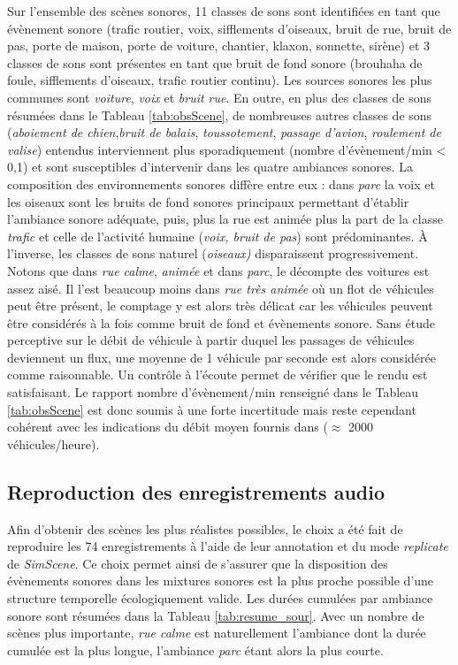 Sur l'ensemble des scènes sonores, 11 classes de sons sont identifiées en tant que évènement sonore  (trafic routier, voix, sifflements d'oiseaux, bruit de rue, bruit de pas, porte de maison, porte de voiture, chantier, klaxon, sonnette, sirène) et 3 classes de sons sont présentes en tant que bruit de fond sonore (brouhaha de foule, sifflements d'oiseaux, trafic routier continu).
Les sources sonores les plus communes sont \textit{voiture}, \textit{voix} et \textit{bruit rue}. En outre, en plus des classes de sons résumées dans le Tableau \ref{tab:obsScene}, de nombreuses autres classes de sons (\textit{aboiement de chien},\textit{bruit de balais}, \textit{toussotement}, \textit{passage d'avion}, \textit{roulement de valise}) entendus interviennent plus sporadiquement (nombre d'évènement/min < 0,1) et sont susceptibles d'intervenir dans les quatre ambiances sonores.
La composition des environnements sonores diffère entre eux : dans \textit{parc} la voix et les oiseaux sont les bruits de fond sonores principaux permettant d'établir l'ambiance sonore adéquate, puis, plus la rue est animée plus la part de la classe \textit{trafic} et celle de l'activité humaine (\textit{voix, bruit de pas}) sont prédominantes. À l'inverse, les classes de sons \og naturel \fg{} (\textit{oiseaux)} disparaissent progressivement.
Notons que dans \textit{rue calme}, \textit{animée} et dans \textit{parc}, le décompte des voitures est assez aisé. Il l'est beaucoup moins dans \textit{rue très animée} où un flot de véhicules peut être présent, le comptage y est alors très délicat car les véhicules peuvent être considérés à la fois comme bruit de fond et évènements sonore.
Sans étude perceptive sur le débit de véhicule à partir duquel les passages de véhicules deviennent un flux, une moyenne de 1 véhicule par seconde est alors considérée comme raisonnable. Un contrôle à l'écoute permet de vérifier que le rendu est satisfaisant. Le rapport nombre d'évènement/min renseigné dans le Tableau \ref{tab:obsScene} est donc soumis à une forte incertitude mais reste cependant cohérent avec les indications du débit moyen fournis dans \cite{aumond2017modeling} ($\approx$ 2000 véhicules/heure). \\

\subsection{Reproduction des enregistrements audio}

Afin d'obtenir des scènes les plus réalistes possibles, le choix a été fait de reproduire les 74 enregistrements à l'aide de leur annotation et du mode \textit{replicate} de \textit{SimScene}. Ce choix permet ainsi de s'assurer que la disposition des évènements sonores dans les mixtures sonores est la plus proche possible d'une structure temporelle écologiquement valide. Les durées cumulées par ambiance sonore sont résumées dans la Tableau \ref{tab:resume_sour}. Avec un nombre de scènes plus importante, \textit{rue calme} est naturellement l'ambiance dont la durée cumulée est la plus longue, l'ambiance \textit{parc} étant alors la plus courte.

